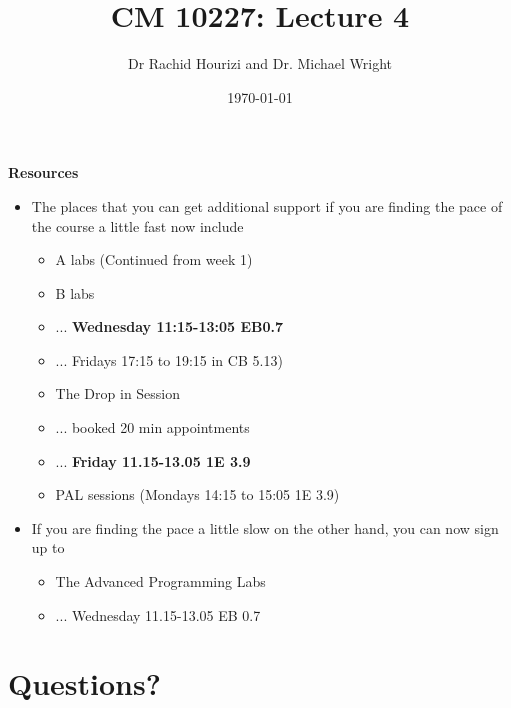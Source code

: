 \documentclass{beamer}
\begin{document}

\title{CM 10227: Lecture 4}
\author{Dr Rachid Hourizi and Dr. Michael Wright}
\date{\today}
\frame{\titlepage}

\begin{frame} 
\begin{center}
\textbf{Resources}
\end{center}
\begin{itemize}
\item The places that you can get additional support if you are finding the pace of the course a little fast now include
\begin{itemize}
\item A labs (Continued from week 1)
\item B labs 
\item ... \textbf{Wednesday 11:15-13:05 EB0.7}
\item ... Fridays 17:15 to 19:15 in CB 5.13)
\item The Drop in Session 
\item ... booked 20 min appointments
\item ... \textbf{Friday 11.15-13.05 1E 3.9}
\item PAL sessions (Mondays 14:15 to 15:05 1E 3.9)
\end{itemize}
\end{itemize}
\end{frame}

 \begin{frame} 
 \begin{itemize}
\item If you are finding the pace a little slow on the other hand, you can now sign up to
\begin{itemize}
\item The Advanced Programming Labs
\item ... Wednesday 11.15-13.05 EB 0.7
\end{itemize}
\end{itemize}
 \end{frame}
 
 \section{Questions?}
 
\end{document}
